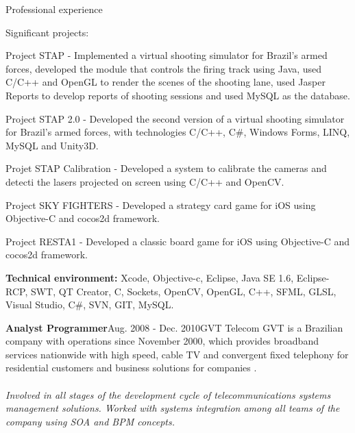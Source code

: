 \documentclass{resume}
\begin{document}
\begin{rSection}{Professional experience}
      \begin{rSubsection}{\fontsize{9}{10}\selectfont Significant projects:}{}{}{}
        \item Project STAP - Implemented a virtual shooting simulator for Brazil's armed forces, developed the module that controls the firing track using Java, used C/C++ and OpenGL to render the scenes of the shooting lane, used Jasper Reports to develop reports of shooting sessions and used MySQL as the database.
        \item Project STAP 2.0 - Developed the second version of a virtual shooting simulator for Brazil's armed forces, with technologies C/C++, C\#, Windows Forms, LINQ, MySQL and Unity3D.
        \item Projet STAP Calibration - Developed a system to calibrate the cameras and detecti the lasers projected on screen using C/C++ and OpenCV.
        \item Project SKY FIGHTERS - Developed a strategy card game for iOS using Objective-C and cocos2d framework.
        \item Project RESTA1 - Developed a classic board game for iOS using Objective-C and cocos2d framework.
      \end{rSubsection}

      {\fontsize{8}{9}\selectfont \textbf{Technical environment:} Xcode, Objective-c, Eclipse, Java SE 1.6, Eclipse-RCP, SWT, QT Creator, C, Sockets, OpenCV, OpenGL, C++, SFML, GLSL, Visual Studio, C\#, SVN, GIT, MySQL.}\\
    

    \begin{rSubsection}{\fontsize{12}{14}\selectfont \bf Analyst Programmer}{\fontsize{12}{14}\selectfont Aug. 2008 - Dec. 2010}{\fontsize{12}{14}\selectfont GVT Telecom}{}
      GVT is a Brazilian company with operations since November 2000, which provides broadband services nationwide with high speed, cable TV and convergent fixed telephony for residential customers and business solutions for companies .\\\\

      \textit{Involved in all stages of the development cycle of telecommunications systems management solutions. Worked with systems integration among all teams of the company using SOA and BPM concepts.}
    
    \end{rSubsection}


\end{rSection}
\end{document}
